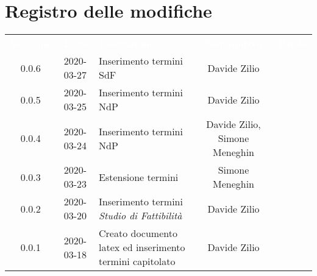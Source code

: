 \section*{Registro delle modifiche}
{
	\centering
	\begin{longtable}{ c c  C{4cm}  c  c }
		\textcolor{white}{\textbf{Versione}} & \textcolor{white}{\textbf{Data}} & \textcolor{white}{\textbf{Descrizione}} & \textcolor{white}{\textbf{Nominativo}} & \textcolor{white}{\textbf{Ruolo}}\\
		0.0.6 & 2020-03-27 & Inserimento termini SdF & Davide Zilio &\reda{}\\
		0.0.5 & 2020-03-25 & Inserimento termini NdP & Davide Zilio &\reda{}\\
		0.0.4 & 2020-03-24 & Inserimento termini NdP & Davide Zilio, Simone Meneghin &\reda{}\\
		
		0.0.3 & 2020-03-23 & Estensione termini & Simone Meneghin & \reda{}\\
		
		0.0.2 & 2020-03-20 & Inserimento termini \textit{Studio di Fattibilità}& Davide Zilio &\reda{}\\
		
		0.0.1 & 2020-03-18 & Creato documento latex ed inserimento termini capitolato & Davide Zilio &\reda{}\\		
		
	\end{longtable}

}